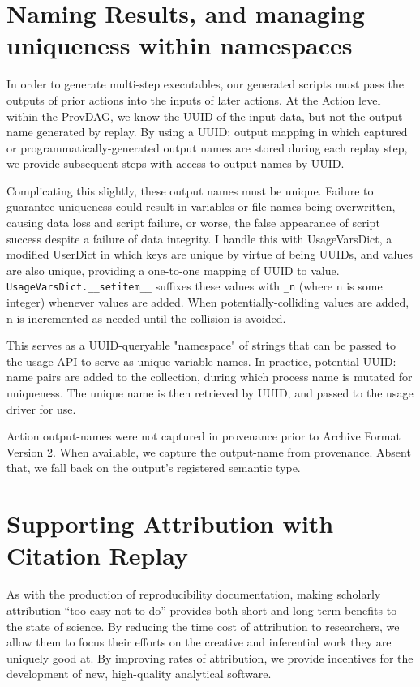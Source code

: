 \section{Naming Results, and managing uniqueness within namespaces}

In order to generate multi-step executables, our generated scripts must pass the
outputs of prior actions into the inputs of later actions. At the Action level
within the ProvDAG, we know the UUID of the input data, but not the output name
generated by replay. By using a {UUID: output} mapping in which captured or
programmatically-generated output names are stored during each replay step, we
provide subsequent steps with access to output names by UUID.

Complicating this slightly, these output names must be unique. Failure to
guarantee uniqueness could result in variables or file names being overwritten,
causing data loss and script failure, or worse, the false appearance of script
success despite a failure of data integrity. I handle this with UsageVarsDict, a
modified UserDict in which keys are unique by virtue of being UUIDs, and values
are also unique, providing a one-to-one mapping of UUID to value.
\texttt{UsageVarsDict.\_\_setitem\_\_} suffixes these values with \texttt{\_n} (where n is some
integer) whenever values are added. When potentially-colliding values are added,
n is incremented as needed until the collision is avoided. 

This serves as a UUID-queryable "namespace" of strings that can be passed to the
usage API to serve as unique variable names. In practice, potential {UUID: name}
pairs are added to the collection, during which process name is mutated for
uniqueness. The unique name is then retrieved by UUID, and passed to the usage
driver for use.

Action output-names were not captured in provenance prior to Archive Format
Version 2. When available, we capture the output-name from provenance. Absent
that, we fall back on the output’s registered semantic type.


\section{Supporting Attribution with Citation Replay}

As with the production of reproducibility documentation, making scholarly
attribution “too easy not to do” provides both short and long-term benefits to
the state of science. By reducing the time cost of attribution to researchers,
we allow them to focus their efforts on the creative and inferential work they
are uniquely good at. By improving rates of attribution, we provide incentives
for the development of new, high-quality analytical software. 

